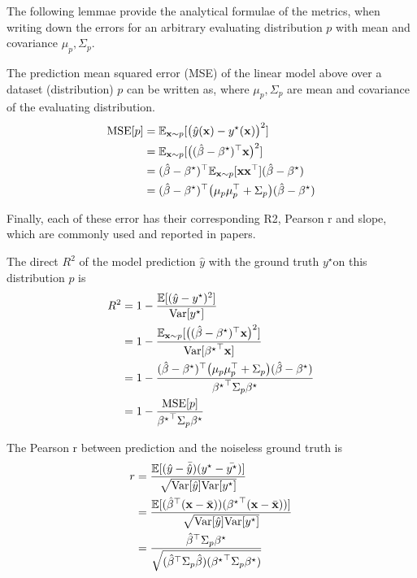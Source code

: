 The following lemmae provide the analytical formulae of the metrics,
when writing down the errors for an arbitrary evaluating distribution
$p$ with mean and covariance $\mu_{p},\Sigma_{p}$.
\begin{lem}
\label{lem:pred_error}The prediction mean squared error (MSE) of
the linear model above over a dataset (distribution) $p$ can be written
as, where $\mu_{p},\Sigma_{p}$ are mean and covariance of the evaluating
distribution.
\begin{align*}
\mathrm{MSE}[p] & =\mathbb{E}_{\mathbf{x}\sim p}[\big(\hat{y}(\mathbf{x})-y^{\star}(\mathbf{x})\big)^{2}]\\
 & =\mathbb{E}_{\mathbf{x}\sim p}[\big((\hat{\beta}-{\beta^{\star}})^{\top}\mathbf{x}\big)^{2}]\\
 & =(\hat{\beta}-{\beta^{\star}})^{\top}\mathbb{E}_{\mathbf{x}\sim p}[\mathbf{x}\mathbf{x}^{\top}](\hat{\beta}-{\beta^{\star}})\\
 & =(\hat{\beta}-{\beta^{\star}})^{\top}\big(\mu_{p}\mu_{p}^{\top}+\Sigma_{p}\big)(\hat{\beta}-{\beta^{\star}})
\end{align*}
\end{lem}
Finally, each of these error has their corresponding R2, Pearson r
and slope, which are commonly used and reported in papers.
\begin{lem}
\label{lem:R2_pred_obs}The direct $R^{2}$ of the model prediction
$\hat{y}$ with the ground truth $y^{\star}$on this distribution
$p$ is
\begin{align*}
R^{2} & =1-\frac{\mathbb{E}[(\hat{y}-y^{\star})^{2}]}{\mathrm{Var}[y^{\star}]}\\
 & =1-\frac{\mathbb{E}_{\mathbf{x}\sim p}[\big((\hat{\beta}-{\beta^{\star}})^{\top}\mathbf{x}\big)^{2}]}{\mathrm{Var}[{{\beta^{\star}}}^{\top}\mathbf{x}]}\\
 & =1-\frac{(\hat{\beta}-{\beta^{\star}})^{\top}\big(\mu_{p}\mu_{p}^{\top}+\Sigma_{p}\big)(\hat{\beta}-{\beta^{\star}})}{{{\beta^{\star}}}^{\top}\Sigma_{p}{\beta^{\star}}}\\
 & =1-\frac{\mathrm{MSE}[p]}{{{\beta^{\star}}}^{\top}\Sigma_{p}{\beta^{\star}}}
\end{align*}
\end{lem}
%
\begin{lem}
\label{lem:Pearson-r_pred_obs}The Pearson r between prediction and
the noiseless ground truth is
\begin{align*}
r & =\frac{\mathbb{E}[(\hat{y}-\bar{\hat{y}})(y^{\star}-\bar{y^{\star}})]}{\sqrt{\mathrm{Var}[\hat{y}]\mathrm{Var}[y^{\star}]}}\\
 & =\frac{\mathbb{E}[({\hat{\beta}}^{\top}(\mathbf{x}-\bar{\mathbf{x}}))({{\beta^{\star}}}^{\top}(\mathbf{x}-\bar{\mathbf{x}}))]}{\sqrt{\mathrm{Var}[\hat{y}]\mathrm{Var}[y^{\star}]}}\\
 & =\frac{{\hat{\beta}}^{\top}\Sigma_{p}{\beta^{\star}}}{\sqrt{({\hat{\beta}}^{\top}\Sigma_{p}\hat{\beta})({{\beta^{\star}}}^{\top}\Sigma_{p}{\beta^{\star}})}}
\end{align*}
\end{lem}
